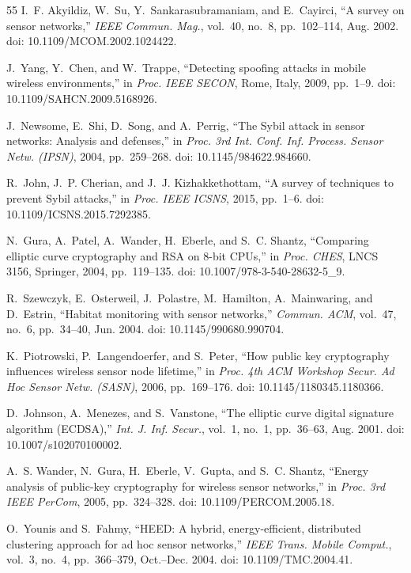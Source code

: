 \documentclass[conference]{IEEEtran}
\begin{document}
\begin{enumerate}
\begin{thebibliography}{55}
I.~F. Akyildiz, W.~Su, Y.~Sankarasubramaniam, and E.~Cayirci, ``A survey on sensor networks,'' \textit{IEEE Commun. Mag.}, vol.~40, no.~8, pp.~102--114, Aug. 2002. doi: 10.1109/MCOM.2002.1024422.

J.~Yang, Y.~Chen, and W.~Trappe, ``Detecting spoofing attacks in mobile wireless environments,'' in \textit{Proc. IEEE SECON}, Rome, Italy, 2009, pp.~1--9. doi: 10.1109/SAHCN.2009.5168926.

J.~Newsome, E.~Shi, D.~Song, and A.~Perrig, ``The Sybil attack in sensor networks: Analysis and defenses,'' in \textit{Proc. 3rd Int. Conf. Inf. Process. Sensor Netw. (IPSN)}, 2004, pp.~259--268. doi: 10.1145/984622.984660.

R.~John, J.~P. Cherian, and J.~J. Kizhakkethottam, ``A survey of techniques to prevent Sybil attacks,'' in \textit{Proc. IEEE ICSNS}, 2015, pp.~1--6. doi: 10.1109/ICSNS.2015.7292385.

N.~Gura, A.~Patel, A.~Wander, H.~Eberle, and S.~C. Shantz, ``Comparing elliptic curve cryptography and RSA on 8-bit CPUs,'' in \textit{Proc. CHES}, LNCS 3156, Springer, 2004, pp.~119--135. doi: 10.1007/978-3-540-28632-5\_9.

R.~Szewczyk, E.~Osterweil, J.~Polastre, M.~Hamilton, A.~Mainwaring, and D.~Estrin, ``Habitat monitoring with sensor networks,'' \textit{Commun. ACM}, vol.~47, no.~6, pp.~34--40, Jun. 2004. doi: 10.1145/990680.990704.

K.~Piotrowski, P.~Langendoerfer, and S.~Peter, ``How public key cryptography influences wireless sensor node lifetime,'' in \textit{Proc. 4th ACM Workshop Secur. Ad Hoc Sensor Netw. (SASN)}, 2006, pp.~169--176. doi: 10.1145/1180345.1180366.

D.~Johnson, A.~Menezes, and S.~Vanstone, ``The elliptic curve digital signature algorithm (ECDSA),'' \textit{Int. J. Inf. Secur.}, vol.~1, no.~1, pp.~36--63, Aug. 2001. doi: 10.1007/s102070100002.

A.~S. Wander, N.~Gura, H.~Eberle, V.~Gupta, and S.~C. Shantz, ``Energy analysis of public-key cryptography for wireless sensor networks,'' in \textit{Proc. 3rd IEEE PerCom}, 2005, pp.~324--328. doi: 10.1109/PERCOM.2005.18.

O.~Younis and S.~Fahmy, ``HEED: A hybrid, energy-efficient, distributed clustering approach for ad hoc sensor networks,'' \textit{IEEE Trans. Mobile Comput.}, vol.~3, no.~4, pp.~366--379, Oct.--Dec. 2004. doi: 10.1109/TMC.2004.41.


\end{thebibliography}
\end{enumerate}
\end{document}
